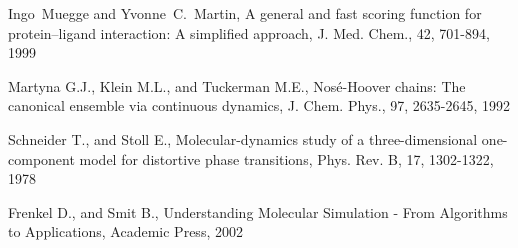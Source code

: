 \documentclass[a4paper,10pt]{article}
\begin{document}
\begin{thebibliography}{2}
Ingo~Muegge and Yvonne~C.~Martin,
A general and fast scoring function for protein--ligand interaction: A simplified approach, J. Med. Chem., 42, 701-894, 1999

Martyna G.J., Klein M.L., and Tuckerman M.E., Nos\'e-Hoover chains: The canonical ensemble via continuous dynamics, J. Chem. Phys., 97, 2635-2645, 1992

Schneider T., and Stoll E., Molecular-dynamics study of a three-dimensional one-component model for distortive phase transitions, Phys. Rev. B, 17, 1302-1322, 1978

 Frenkel D., and Smit B., Understanding Molecular Simulation - From Algorithms to Applications, Academic Press, 2002

\end{thebibliography}
\end{document}
